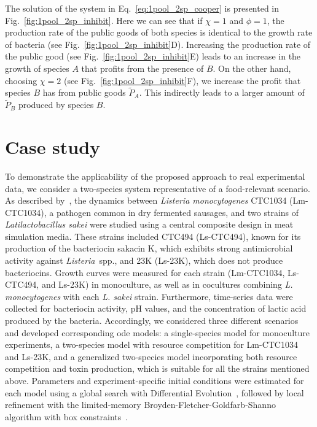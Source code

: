 \documentclass[10pt,1p,authoryear]{elsarticle}
\numberwithin{equation}{section}
\begin{document}
%
The solution of the system in Eq.~\eqref{eq:1pool_2sp_cooper} is presented in Fig.~\ref{fig:1pool_2sp_inhibit}.
Here we can see that if $\chi=1$ and $\phi=1$, the production rate of the public goods of both species is identical to the growth rate of bacteria (see Fig.~\ref{fig:1pool_2sp_inhibit}D).
Increasing the production rate of the public good (see Fig.~\ref{fig:1pool_2sp_inhibit}E) leads to an increase in the growth of species $A$ that profits from the presence of $B$.
On the other hand, choosing $\chi=2$ (see Fig.~\ref{fig:1pool_2sp_inhibit}F), we increase the profit that species $B$ has from public goods $\tilde{P}_A$.
This indirectly leads to a larger amount of $\tilde{P}_B$ produced by species $B$.
\section{Case study}
\label{section:casestudy}
To demonstrate the applicability of the proposed approach to real experimental data, we consider a two-species system representative of a food-relevant scenario.
As described by~\citet{ferrer-bustinsAntilisterialEffect2024}, the dynamics between \textit{Listeria monocytogenes} CTC1034 (Lm-CTC1034), a pathogen common in dry fermented sausages, and two strains of \textit{Latilactobacillus sakei} were studied using a central composite design in meat simulation media.
These strains included CTC494 (Ls-CTC494), known for its production of the bacteriocin sakacin K, which exhibits strong antimicrobial activity against \textit{Listeria}~spp., and 23K (Ls-23K), which does not produce bacteriocins.
Growth curves were measured for each strain (Lm-CTC1034, Ls-CTC494, and Ls-23K) in monoculture, as well as in cocultures combining \textit{L. monocytogenes} with each \textit{L. sakei} strain.
Furthermore, time-series data were collected for bacteriocin activity, pH values, and the concentration of lactic acid produced by the bacteria.
Accordingly, we considered three different scenarios and developed corresponding \ac{ode} models: a single-species model for monoculture experiments, a two-species model with resource competition for Lm-CTC1034 and Ls-23K, and a generalized two-species model incorporating both resource competition and toxin production, which is suitable for all the strains mentioned above.
Parameters and experiment-specific initial conditions were estimated for each model using a global search with Differential Evolution~\citep{stornDifferentialEvolutionSimple1997}, followed by local refinement with the limited-memory Broyden-Fletcher-Goldfarb-Shanno algorithm with box constraints~\citep{doi:10.1137/0916069}.
%
\end{document}
